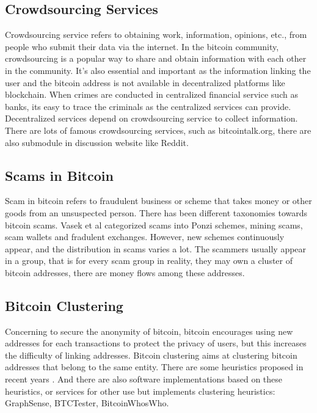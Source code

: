 \subsection{Crowdsourcing Services}
Crowdsourcing service refers to obtaining work, information, opinions, etc., from people who submit their data via the internet. In the bitcoin community, crowdsourcing is a popular way to share and obtain information with each other in the community. It's also essential and important as the information linking the user and the bitcoin address is not available in decentralized platforms like blockchain. When crimes are conducted in centralized financial service such as banks, its easy to trace the criminals as the centralized services can provide. Decentralized services depend on crowdsourcing service to collect information. There are lots of famous crowdsourcing services, such as bitcointalk.org\cite{bitcointalk}, there are also submodule in discussion website like Reddit\cite{reddit}.
\subsection{Scams in Bitcoin}

Scam in bitcoin refers to fraudulent business or scheme that takes money or other goods from an unsuspected person. There has been different taxonomies towards bitcoin scams. Vasek et al \cite{vasek2015there} categorized scams into Ponzi schemes, mining scams, scam wallets and fradulent exchanges. However, new schemes continuously appear, and the distribution in scams varies a lot. The scammers usually appear in a group, that is for every scam group in reality, they may own a cluster of bitcoin addresses, there are money flows among these addresses.

\subsection{Bitcoin Clustering}
Concerning to secure the anonymity of bitcoin, bitcoin encourages using new addresses for each transactions to protect the privacy of users, but this increases the difficulty of linking addresses.
Bitcoin clustering aims at clustering bitcoin addresses that belong to the same entity. There are some heuristics proposed in recent years \cite{zhang2020heuristic}. And there are also software implementations based on these heuristics, or services for other use but implements clustering heuristics: GraphSense\cite{haslhofer2021graphsense}, BTCTester\cite{btctester}, BitcoinWhosWho\cite{bitcoinwhoswho}.
